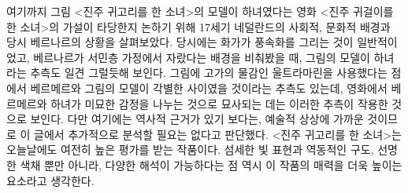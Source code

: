 여기까지 그림 <진주 귀고리를 한 소녀>의 모델이 하녀였다는 영화 <진주 귀걸이를 한 소녀>의 가설이 타당한지 논하기 위해 17세기 네덜란드의 사회적, 문화적 배경과 당시 베르나르의 상황을 살펴보았다. 당시에는 화가가 풍속화를 그리는 것이 일반적이었고, 베르나르가 서민층 가정에서 자랐다는 배경을 비춰봤을 때, 그림의 모델이 하녀라는 추측도 일견 그럴듯해 보인다. 그림에 고가의 물감인 울트라마린을 사용했다는 점에서 베르메르와 그림의 모델이 각별한 사이였을 것이라는 추측도 있는데, 영화에서 베르메르와 하녀가 미묘한 감정을 나누는 것으로 묘사되는 데는 이러한 추측이 작용한 것으로 보인다. 다만 여기에는 역사적 근거가 있기 보다는, 예술적 상상에 가까운 것이므로 이 글에서 추가적으로 분석할 필요는 없다고 판단했다. <진주 귀고리를 한 소녀>는 오늘날에도 여전히 높은 평가를 받는 작품이다. 섬세한 빛 표현과 역동적인 구도, 선명한 색채 뿐만 아니라, 다양한 해석이 가능하다는 점 역시 이 작품의 매력을 더욱 높이는 요소라고 생각한다.
